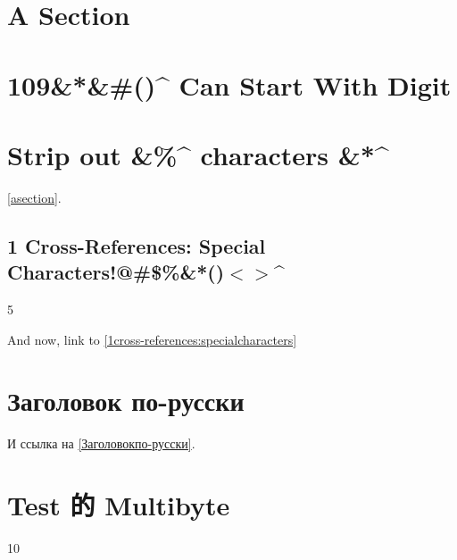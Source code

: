 
\def\mytitle{Cross-References}


\part{A Section }
\label{asection}

\part{109\&*\&\#()\^{} Can Start With Digit }
\label{109canstartwithdigit}

\part{Strip out \&\%\^{} characters \&*\^{} }
\label{stripoutcharacters}

\autoref{asection}.

\chapter{1 Cross-References: Special Characters!@\#\$\%\&*()$<$$>$\^{} }
\label{1cross-references:specialcharacters}

5

And now, link to \autoref{1cross-references:specialcharacters}

\part{Заголовок по-русски }
\label{Заголовокпо-русски}

И ссылка на \autoref{Заголовокпо-русски}.

\part{Test 的 Multibyte }
\label{test的multibyte}

10



